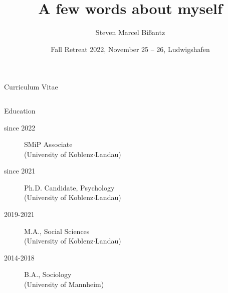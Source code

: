 \documentclass[10pt]{beamer}
\title[A few words about myself]{A few words about myself}
\author{Steven Marcel Bißantz}
\institute{University of Koblenz$\cdot$Landau}
\date[SMiP Fall Reatreat 2022]{Fall Retreat 2022, November 25 -- 26, Ludwigshafen}
\begin{document}

	\begin{frame}
		\titlepage 
	\end{frame}
	

	

	\begin{frame}{Curriculum Vitae}
		\begin{columns}
			\begin{column}{0.6\textwidth}
				{\large Education}\\[2ex]
				\begin{description}
					\item[since 2022] SMiP Associate\\{\tiny (University of Koblenz$\cdot$Landau) }
					\item[since 2021] Ph.D. Candidate, Psychology\\ {\tiny(University of Koblenz$\cdot$Landau)}
					\item[2019-2021] M.A., Social Sciences\\{\tiny(University of Koblenz$\cdot$Landau)}
					\item[2014-2018] B.A., Sociology\\ {\tiny(University of Mannheim)}
				\end{description}
			\end{column}
			\begin{column}{0.4\textwidth}
				\begin{figure}
				\end{figure}
			\end{column}
		\end{columns}
	\end{frame}
\end{document}
